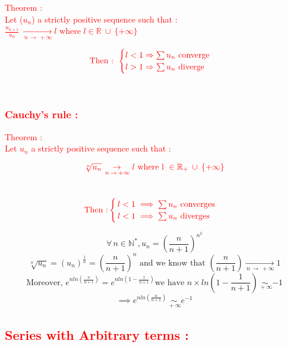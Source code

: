 \documentclass[a4paper,12pt]{article}
\begin{document}
\textcolor{red}{Theorem :}\\

\textcolor{red}{Let ($u_n$) a strictly positive sequence such that : }\\

\textcolor{red}{$\frac{u_{n+1}}{u_n} \: \underset{\,n \,\to \,+\infty}{\to} l$ where $l \in \mathbb{R} \:\cup \: \{ +\infty\}$}

\[
\textcolor{red}{ \text{Then : }
\begin{cases}
    l < 1 \Rightarrow \sum u_n \text{ converge} \\
    l > 1 \Rightarrow \sum u_n \text{ diverge}
\end{cases}
}
\]

\\

\textcolor{red}{\subsubsection*{Cauchy's rule :}}
\bigskip

\textcolor{red}{Theorem :}\\

\textcolor{red}{Let $u_n$ a strictly positive sequence such that :}

\[
\textcolor{red}{\sqrt[n]{u_n} \underset{\, n\, \to \, +\infty}{\to} l \text{ where l } \in \mathbb{R_+} \: \cup \:\{+\infty\}}
\] \\
\[
\textcolor{red}{\text{Then :} \begin{cases}
    \,l < 1 \implies \sum{u_n} \text{ converges}\\
    \, l< 1\implies \sum{u_n} \text{ diverges}
\end{cases}}
\]

\[
\forall \, n\in\mathbb{N}^*, u_n = (\frac{n}{n+1})^{n^2} 
\]
\[
\sqrt[n]{u_n} = (u_n)^\frac{1}{n} = (\frac{n}{n+1})^n 
\text{ and we know that } (\frac{n}{n+1}) \underset{\, n\, \to \, +\infty}{\to} 1
\]
\[
\text{Moreover, } e^{nln(\frac{n}{n+1})} = e^{nln(1-\frac{1}{n+1})} 
\text{we have } n\times ln(1 - \frac{1}{n+1}) \underset{\,+\infty}{\sim} {-1} 
\]
\[
\implies e^{nln(\frac{n}{n+1})} \underset{\,+\infty}{\sim} {e^{-1}} 
\]

\newpage

\textcolor{red}{\subsection*{Series with Arbitrary terms :}}\bigskip
\end{document}
